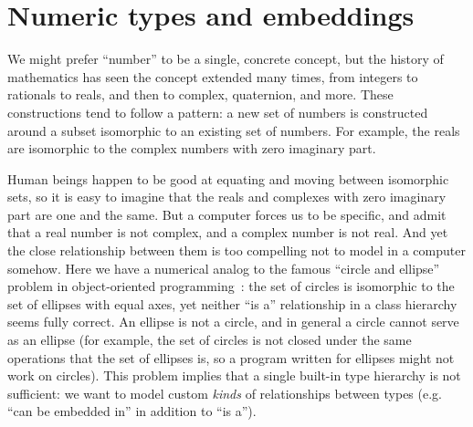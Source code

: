 

\section{Numeric types and embeddings}

We might prefer ``number'' to be a single, concrete concept, but the history of
mathematics has seen the concept extended many times, from integers to rationals to
reals, and then to complex, quaternion, and more.
These constructions tend to follow a pattern: a new set of numbers is constructed
around a subset isomorphic to an existing set of numbers.
For example, the reals are isomorphic to the complex numbers with zero imaginary part.

Human beings happen to be good at equating and moving between isomorphic sets,
so it is easy to imagine that the reals and complexes with zero imaginary
part are one and the same.
But a computer forces us to be specific, and admit
that a real number is not complex, and a complex number is not real.
And yet the close relationship between them is too compelling not to model in a
computer somehow.
Here we have a numerical analog to the famous ``circle and ellipse'' problem in
object-oriented programming~\cite{cline1995c++}: the set of circles is
isomorphic to the set of ellipses with equal axes, yet neither ``is a''
relationship in a class hierarchy seems fully correct.
An ellipse is not a circle, and in general a circle cannot serve as an ellipse
(for example, the set of circles is not closed under the same operations that the
set of ellipses is, so a program written for ellipses might not work on circles).
This problem implies that a single built-in type hierarchy is not
sufficient: we want to model custom \emph{kinds} of relationships between
types (e.g. ``can be embedded in'' in addition to ``is a'').



